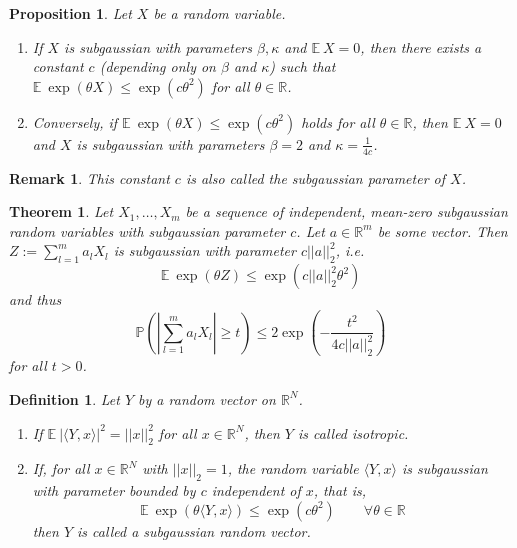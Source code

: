 \documentclass[10pt,a4paper]{article}
\theoremstyle{thmstyle}
\newtheorem{definition}{Definition}
\newtheorem{theorem}{Theorem}
\newtheorem{proposition}{Proposition}
\newtheorem{remark}{Remark}
\newcommand{\E}{\mathbb{E}~}
\renewcommand{\Pr}[1]{\mathbb{P}\left( #1 \right)}
\begin{document}
\begin{proposition}
  Let $X$ be a random variable.
  \begin{enumerate}
  \item If $X$ is subgaussian with parameters $\beta, \kappa$ and $\E X = 0$, then there exists a constant $c$ (depending only on $\beta$ and $\kappa$) such that $\E \exp(\theta X) \le \exp(c \theta^{2})$ for all $\theta \in \mathbb{R}$.
  \item Conversely, if $\E \exp(\theta X) \le \exp(c \theta^{2})$ holds for all $\theta \in \mathbb{R}$, then $\E X = 0$ and $X$ is subgaussian with parameters $\beta = 2$ and $\kappa = \frac{1}{4c}$.
  \end{enumerate}
\end{proposition}

\begin{remark}
  This constant $c$ is also called the \emph{subgaussian parameter} of $X$.
\end{remark}

\begin{theorem}
  Let $X_{1}, \dots, X_{m}$ be a sequence of independent, mean-zero subgaussian random variables with subgaussian parameter $c$.
  Let $a \in \mathbb{R}^{m}$ be some vector.
  Then $Z := \sum_{l = 1}^{m} a_{l} X_{l}$ is subgaussian with parameter $c||a||_{2}^{2}$, i.e.
  \begin{equation*}
    \E \exp(\theta Z) \le \exp\left( c||a||_{2}^{2} \theta^{2} \right)
  \end{equation*}
  and thus
  \begin{equation*}
    \Pr{\left| \sum_{l = 1}^{m} a_{l} X_{l} \right| \ge t} \le 2 \exp\left( -\frac{t^{2}}{4c||a||_{2}^{2}} \right)
  \end{equation*}
  for all $t > 0$.
\end{theorem}

\begin{definition}
  Let $Y$ by a random vector on $\mathbb{R}^{N}$.
  \begin{enumerate}
  \item If $\E |\langle Y, x \rangle|^{2} = ||x||_{2}^{2}$ for all $x \in \mathbb{R}^{N}$, then $Y$ is called \emph{isotropic}.
  \item If, for all $x \in \mathbb{R}^{N}$ with $||x||_{2} = 1$, the random variable $\langle Y, x \rangle$ is subgaussian with parameter bounded by $c$ independent of $x$, that is,
    \begin{equation*}
      \E \exp(\theta \langle Y, x \rangle) \le \exp(c \theta^{2}) \qquad \forall \theta \in \mathbb{R}
    \end{equation*}
    then $Y$ is called a \emph{subgaussian random vector}.
  \end{enumerate}
\end{definition}
\end{document}
